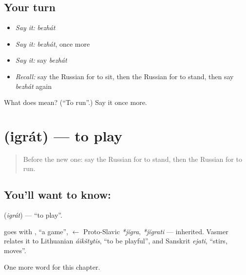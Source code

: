 \subsection*{Your turn}
\begin{itemize}
\raggedright
  \item \emph{Say it:} \emph{bezhát}
  \item \emph{Say it:} \emph{bezhát}, once more
  \item \emph{Say it:} say \emph{bezhát}
  \item \emph{Recall:} say the Russian for to sit, then the Russian for to stand, then say \emph{bezhát} again
\end{itemize}

\begin{tcolorbox}[breakable,colback=teal!4,colframe=teal!35!black,title={Before you move on}]
What does  mean? (\textquotedblleft{}To run\textquotedblright{}.) Say it once more.
\end{tcolorbox}
\section[\texorpdfstring{\ru{играть} (igrát)}{играть (igrát)}]{ (igrát) — to play}

\label{lesson:RU-C40-igrat}



\begin{quote}
Before the new one: say the Russian for to stand, then the Russian for to run.
\end{quote}

\subsection*{You'll want to know: }
\textbf{} (\emph{igrát}) — \textquotedblleft{}to play\textquotedblright{}.

\begin{cousinweb}
\textbf{} goes with \emph{}, \textquotedblleft{}a game\textquotedblright{}, $\leftarrow$ Proto-Slavic \emph{*jĭgra}, \emph{*jĭgrati} — inherited. Vasmer relates it to Lithuanian \emph{áikštytis}, \textquotedblleft{}to be playful\textquotedblright{}, and Sanskrit \emph{ejati}, \textquotedblleft{}stirs, moves\textquotedblright{}.
\end{cousinweb}

\begin{grammarlens}[title={What you've built}]
One more word for this chapter.
\end{grammarlens}

